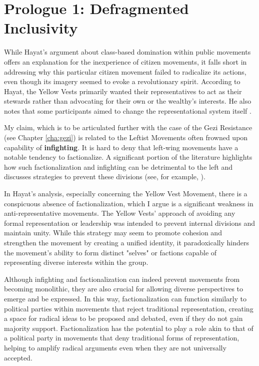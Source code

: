 \section{Prologue 1: Defragmented Inclusivity}
While Hayat's argument about class-based domination within public movements offers an explanation for the inexperience of citizen movements, it falls short in addressing why this particular citizen movement failed to radicalize its actions, even though its imagery seemed to evoke a revolutionary spirit. According to Hayat, the Yellow Vests primarily wanted their representatives to act as their stewards rather than advocating for their own or the wealthy's interests. He also notes that some participants aimed to change the representational system itself \parencite[see 15]{hayat2024}.

My claim, which is to be articulated further with the case of
the Gezi Resistance (see Chapter \ref{cha:gezi}) is related to the Leftist Movements
often frowned upon capability of \textbf{infighting}. It is hard to deny that left-wing movements have a notable tendency to factionalize. A significant portion of the literature highlights how such factionalization and infighting can be detrimental to the left and discusses strategies to prevent these divisions (see, for example, \cite{smith2012a}).

In Hayat's analysis, especially concerning the Yellow Vest Movement, there is a conspicuous absence of factionalization, which I argue is a significant weakness in anti-representative movements. The Yellow Vests’ approach of avoiding any formal representation or leadership was intended to prevent internal divisions and maintain unity. While this strategy may seem to promote cohesion and strengthen the movement by creating a unified identity, it paradoxically hinders the movement's ability to form distinct "selves" or factions capable of representing diverse interests within the group.

Although infighting and factionalization can indeed prevent movements from becoming monolithic, they are also crucial for allowing diverse perspectives to emerge and be expressed. In this way, factionalization can function similarly to political parties within movements that reject traditional representation, creating a space for radical ideas to be proposed and debated, even if they do not gain majority support. Factionalization has the potential to play a role akin to that of a political party in movements that deny traditional forms of representation, helping to amplify radical arguments even when they are not universally accepted.

